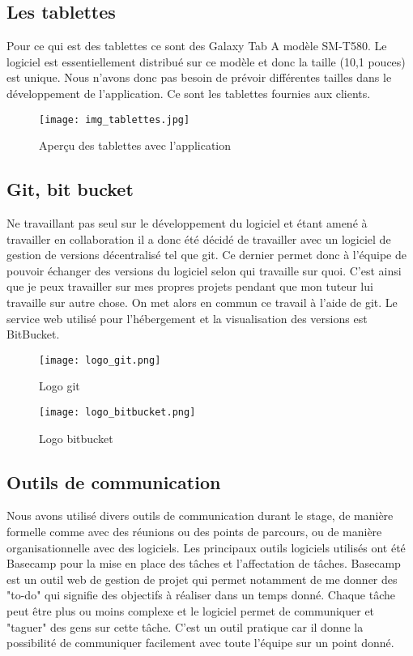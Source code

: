 \subsection{Les tablettes}

Pour ce qui est des tablettes ce sont des Galaxy Tab A modèle SM-T580. Le logiciel est essentiellement distribué sur ce modèle et donc la taille (10,1 pouces) est unique. Nous n'avons donc pas besoin de prévoir différentes tailles dans le développement de l'application. Ce sont les tablettes fournies aux clients.

\begin{figure}[!htb]
  \centering
  \texttt{[image: img\_tablettes.jpg]}
  \caption{Aperçu des tablettes avec l'application}
\end{figure}

\subsection{Git, bit bucket}

Ne travaillant pas seul sur le développement du logiciel et étant amené à travailler en collaboration il a donc été décidé de travailler avec un logiciel de gestion de versions décentralisé tel que git. Ce dernier permet donc à l'équipe de pouvoir échanger des versions du logiciel selon qui travaille sur quoi. C'est ainsi que je peux travailler sur mes propres projets pendant que mon tuteur lui travaille sur autre chose. On met alors en commun ce travail à l'aide de git. Le service web utilisé pour l'hébergement et la visualisation des versions est BitBucket.

\begin{figure}[!htb]
  \centering
  \begin{minipage}[b]{0.25\textwidth}
    \texttt{[image: logo\_git.png]}
    \caption{Logo git}
  \end{minipage}
  \hfill
  \begin{minipage}[b]{0.3\textwidth}
    \texttt{[image: logo\_bitbucket.png]}
    \caption{Logo bitbucket}
  \end{minipage}
\end{figure}


\subsection{Outils de communication}

Nous avons utilisé divers outils de communication durant le stage, de manière formelle comme avec des réunions ou des points de parcours, ou de manière organisationnelle avec des logiciels. Les principaux outils logiciels utilisés ont été Basecamp pour la mise en place des tâches et l'affectation de tâches. Basecamp est un outil web de gestion de projet qui permet notamment de me donner des "to-do" qui signifie des objectifs à réaliser dans un temps donné. Chaque tâche peut être plus ou moins complexe et le logiciel permet de communiquer et "taguer" des gens sur cette tâche. C'est un outil pratique car il donne la possibilité de communiquer facilement avec toute l'équipe sur un point donné.

